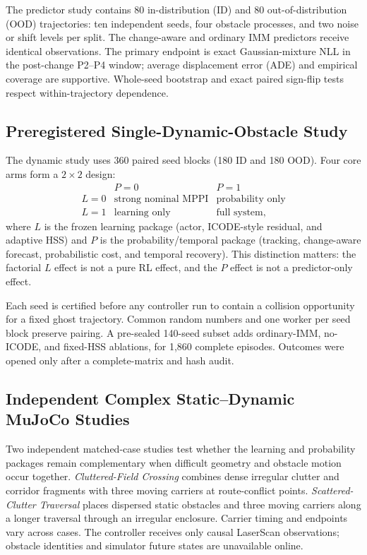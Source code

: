 \documentclass[conference]{IEEEtran}
\begin{document}
The predictor study contains 80 in-distribution (ID) and 80 out-of-distribution (OOD) trajectories: ten independent seeds, four obstacle processes, and two noise or shift levels per split. The change-aware and ordinary IMM predictors receive identical observations. The primary endpoint is exact Gaussian-mixture NLL in the post-change P2--P4 window; average displacement error (ADE) and empirical coverage are supportive. Whole-seed bootstrap and exact paired sign-flip tests respect within-trajectory dependence.

\subsection{Preregistered Single-Dynamic-Obstacle Study}

The dynamic study uses 360 paired seed blocks (180 ID and 180 OOD). Four core arms form a $2\times2$ design:
\begin{equation*}
\begin{array}{c|cc}
 & P=0 & P=1\\ \hline
L=0 & \text{strong nominal MPPI} & \text{probability only}\\
L=1 & \text{learning only} & \text{full system},
\end{array}
\end{equation*}
where $L$ is the frozen learning package (actor, ICODE-style residual, and adaptive HSS) and $P$ is the probability/temporal package (tracking, change-aware forecast, probabilistic cost, and temporal recovery). This distinction matters: the factorial $L$ effect is not a pure RL effect, and the $P$ effect is not a predictor-only effect.

Each seed is certified before any controller run to contain a collision opportunity for a fixed ghost trajectory. Common random numbers and one worker per seed block preserve pairing. A pre-sealed 140-seed subset adds ordinary-IMM, no-ICODE, and fixed-HSS ablations, for 1,860 complete episodes. Outcomes were opened only after a complete-matrix and hash audit.

\subsection{Independent Complex Static--Dynamic MuJoCo Studies}

Two independent matched-case studies test whether the learning and probability packages remain complementary when difficult geometry and obstacle motion occur together. \emph{Cluttered-Field Crossing} combines dense irregular clutter and corridor fragments with three moving carriers at route-conflict points. \emph{Scattered-Clutter Traversal} places dispersed static obstacles and three moving carriers along a longer traversal through an irregular enclosure. Carrier timing and endpoints vary across cases. The controller receives only causal LaserScan observations; obstacle identities and simulator future states are unavailable online.
\end{document}
